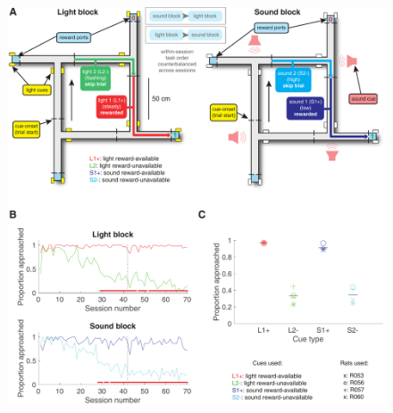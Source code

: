 \documentclass[11pt]{article}
\begin{document}
 \begin{figure}[ht!]
\centering
\includegraphics[height=0.7\textheight]{Fig 2 - Behavioral schematic and results.pdf}

\end{figure}
\end{document}
